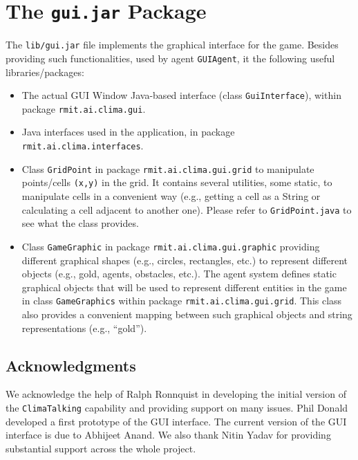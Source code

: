 \documentclass[10pt]{article}
\begin{document}
\section{The \texttt{gui.jar} Package}

The \texttt{lib/gui.jar} file implements the graphical interface for the game. Besides providing such functionalities, used by agent \texttt{GUIAgent}, it the following useful libraries/packages:
%
\begin{itemize}
\item The actual GUI Window Java-based interface (class \texttt{GuiInterface}), within package \texttt{rmit.ai.clima.gui}.

\item Java interfaces used in the application, in package \texttt{rmit.ai.clima.interfaces}.

\item Class \texttt{GridPoint} in package \texttt{rmit.ai.clima.gui.grid} to manipulate points/cells \texttt{(x,y)} in the grid. It contains several utilities, some static, to manipulate cells in a convenient way (e.g., getting a cell as a String or calculating a cell adjacent to another one). Please refer to \texttt{GridPoint.java} to see what the class provides.

\item Class \texttt{GameGraphic} in package \texttt{rmit.ai.clima.gui.graphic} providing different graphical shapes (e.g., circles, rectangles, etc.) to represent different objects (e.g., gold, agents, obstacles, etc.).
The agent system defines static graphical objects that will be used to represent different entities in the game in class \texttt{GameGraphics} within package \texttt{rmit.ai.clima.gui.grid}. This class also provides a convenient mapping between such graphical objects and string representations (e.g., ``gold'').
\end{itemize}






\subsection*{Acknowledgments}

We acknowledge the help of Ralph Ronnquist in developing the initial version of the \texttt{ClimaTalking} capability and providing support on many issues. 
Phil Donald developed a first prototype of the GUI interface. 
The current version of the GUI interface is due to Abhijeet Anand.
We also thank Nitin Yadav for providing substantial support across the whole project.


% 
\end{document}

